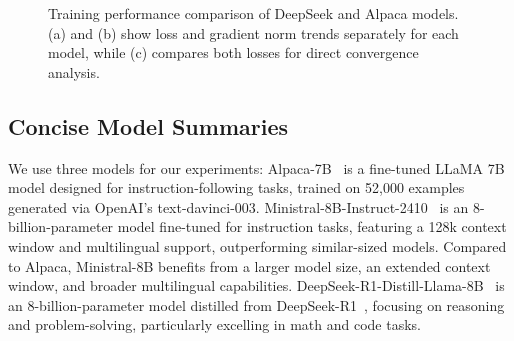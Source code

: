 \documentclass[12pt,a4paper]{article}
\begin{document}
\begin{figure}

    \vspace{0.2cm}
    {\centering
    }

    \caption{Training performance comparison of DeepSeek and Alpaca models.
        (a) and (b) show loss and gradient norm trends separately for each model,
        while (c) compares both losses for direct convergence analysis. }
    \label{fig:training_comparison}
\end{figure}



\subsection{Concise Model Summaries}

We use three models for our experiments:
Alpaca-7B~\cite{taori2023stanford} is a fine-tuned LLaMA 7B model designed for instruction-following tasks, trained on 52,000 examples generated via OpenAI’s text-davinci-003.
Ministral-8B-Instruct-2410~\cite{mistralai2024ministral8b} is an 8-billion-parameter model fine-tuned for instruction tasks, featuring a 128k context window and multilingual support, outperforming similar-sized models.
Compared to Alpaca, Ministral-8B benefits from a larger model size, an extended context window, and broader multilingual capabilities.
DeepSeek-R1-Distill-Llama-8B~\cite{deepseekai2025deepseekr1distillllama8b} is an 8-billion-parameter model distilled from DeepSeek-R1~\cite{guo2025deepseek}, focusing on reasoning and problem-solving, particularly excelling in math and code tasks.
\end{document}
